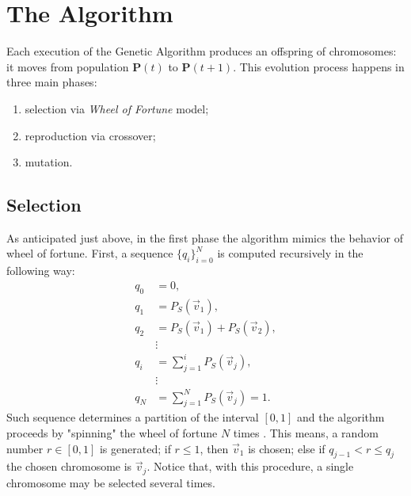\documentclass[%
    corpo=11pt,
    twoside,
    stile=classica,
    oldstyle,
    autoretitolo,
    tipotesi=magistrale,
    greek,
    evenboxes,
    english
]{toptesi}
\begin{document}
\section{The Algorithm}
Each execution of the Genetic Algorithm produces an offspring of chromosomes: it moves from  population $\textbf{P}(t)$ to $\textbf{P}(t+1)$. This evolution process happens in three main phases:
\begin{enumerate}
\item selection via \textit{Wheel of Fortune} model;
\item reproduction via crossover;
\item mutation.
\end{enumerate}
\subsection{Selection}
As anticipated just above, in the first phase the algorithm mimics the behavior of wheel of fortune. First, a sequence $\{q_i\}_{i=0}^{N}$ is computed recursively in the following way:
\begin{align}
q_0 &= 0, \nonumber \\
q_1 &= P_S(\vec{v}_1), \nonumber \\
q_2 &= P_S(\vec{v}_1) + P_S(\vec{v}_2), \nonumber \\
&\vdots \nonumber \\
q_i &= \sum_{j=1}^{i}P_S(\vec{v}_j), \nonumber \\
&\vdots \nonumber \\
q_N &= \sum_{j=1}^{N}P_S(\vec{v}_j) = 1.
\end{align}
Such sequence determines a partition of the interval $\left[0,1\right]$ and the algorithm proceeds by "spinning" the wheel of fortune $N$ times . This means, a random number $r\in \left[0,1\right]$ is generated; if $r \leq 1$, then $\vec{v}_1$ is chosen; else if $q_{j-1} < r \leq q_j$ the chosen chromosome is $\vec{v}_j$. Notice that, with this procedure, a single chromosome may be selected several times. 
\end{document}
